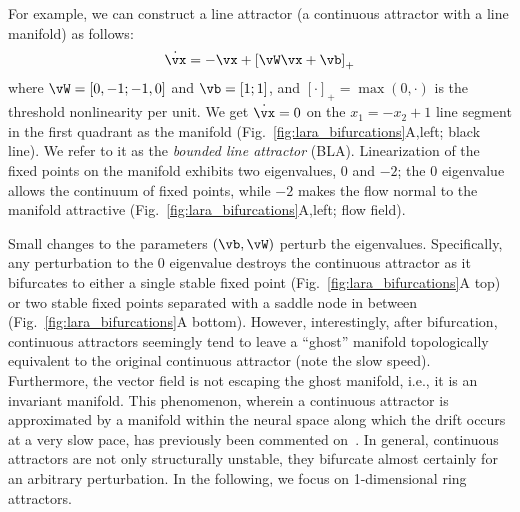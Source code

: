 \documentclass{article} %
\newcounter{ct}
\newcommand{\reals}{\mathbb{R}}
\theoremstyle{definition}
\theoremstyle{remark}
\begin{document}
For example, we can construct a line attractor (a continuous attractor with a line manifold) as follows:
\begin{align}\label{eq:TLN}
    \dot{\vx} = -\vx + \left[ \vW \vx + \vb \right]_{+}
\end{align}
where $\vW = [0, -1; -1, 0]$ and $\vb = [1; 1]$, and $[\cdot]_{+} = \max(0,\cdot)$ is the threshold nonlinearity per unit.
We get $\dot{\vx} = 0$ on the $x_1 = -x_2 + 1$ line segment in the first quadrant as the manifold (Fig.~\ref{fig:lara_bifurcations}A,left; black line).
We refer to it as the \emph{bounded line attractor} (BLA).
Linearization of the fixed points on the manifold exhibits two eigenvalues, $0$ and $-2$;
the $0$ eigenvalue allows the continuum of fixed points, while $-2$ makes the flow normal to the manifold attractive (Fig.~\ref{fig:lara_bifurcations}A,left; flow field).

Small changes to the parameters $(\vb,\vW)$ perturb the eigenvalues.
Specifically, any perturbation to the $0$ eigenvalue destroys the continuous attractor as it bifurcates to either
a single stable fixed point (Fig.~\ref{fig:lara_bifurcations}A top) or two stable fixed points separated with a saddle node in between (Fig.~\ref{fig:lara_bifurcations}A bottom).
However, interestingly, after bifurcation, continuous attractors seemingly tend to leave a ``ghost'' manifold topologically equivalent to the original continuous attractor (note the slow speed).
Furthermore, the vector field is not escaping the ghost manifold, i.e., it is an invariant manifold.
This phenomenon, wherein a continuous attractor is approximated by a manifold within the neural space along which the drift occurs at a very slow pace, has previously been commented on~\citep{seung1997learning,Mante2013-em}.
In general, continuous attractors are not only structurally unstable, they bifurcate almost certainly for an arbitrary perturbation.
In the following, we focus on 1-dimensional ring attractors.
\end{document}
